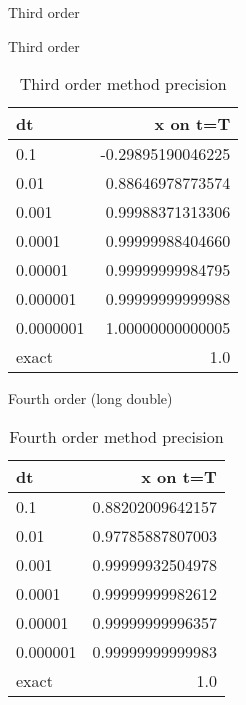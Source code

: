 \documentclass[10pt]{beamer}
\begin{document}
\begin{frame}{Third order}
  \begin{figure}
  \end{figure}
\end{frame}

\begin{frame}{Third order}
  \begin{table}
    \caption{Third order method precision}
    \begin{tabular}{lr}
      \toprule
      dt & x on t=T\\
      \midrule
      0.1 & -0.29895190046225\\
      0.01 & 0.88646978773574\\
      0.001 & 0.99988371313306\\
      0.0001 & 0.99999988404660\\
      0.00001 & 0.99999999984795\\
      0.000001 & 0.99999999999988\\
      0.0000001 & 1.00000000000005\\
      \midrule
      exact & 1.0 \\
      \bottomrule
    \end{tabular}
  \end{table}
\end{frame}

\begin{frame}{Fourth order (long double)}
  \begin{table}
    \caption{Fourth order method precision}
    \begin{tabular}{lr}
      \toprule
      dt & x on t=T\\
      \midrule
      0.1 & 0.88202009642157\\
      0.01 & 0.97785887807003\\
      0.001 & 0.99999932504978\\
      0.0001 & 0.99999999982612\\
      0.00001 & 0.99999999996357\\
      0.000001 & 0.99999999999983\\
      \midrule
      exact & 1.0 \\
      \bottomrule
    \end{tabular}
  \end{table}
\end{frame}
\end{document}
